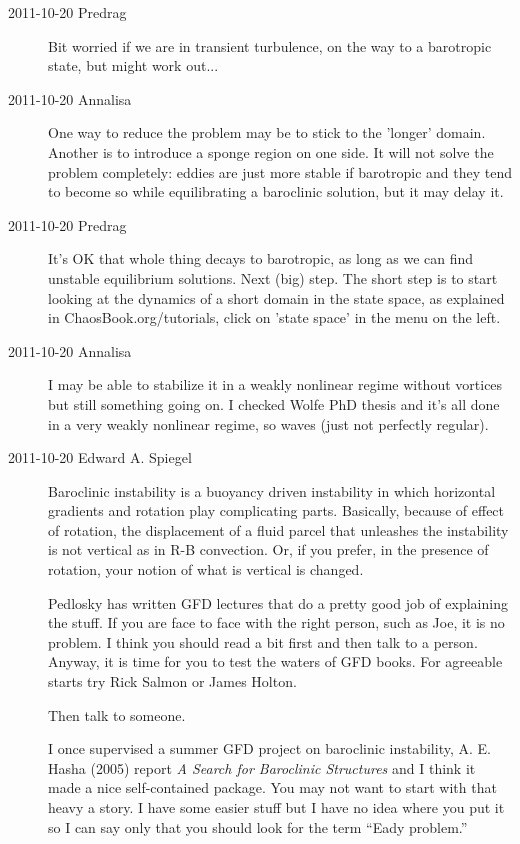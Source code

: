 \begin{description}
\item[2011-10-20 Predrag]
Bit worried if we are in transient turbulence, on the way to a
barotropic state, but might work out...

\item[2011-10-20 Annalisa]
One way to reduce the problem may be to stick to the 'longer' domain.
Another is to introduce a sponge region on one side. It will not solve the problem
completely: eddies are just more stable if barotropic and they tend to
become so while equilibrating a baroclinic solution, but it may delay
it.

\item[2011-10-20 Predrag]
It's OK that whole thing decays to barotropic, as long as we can find
unstable equilibrium solutions. Next (big) step. The short step is
to start looking at the dynamics of a short domain in the state space,
as explained in ChaosBook.org/tutorials, click on 'state space' in the
menu on the left.

\item[2011-10-20 Annalisa]
I may be able to stabilize it in a weakly nonlinear regime without
vortices but still something going on. I checked Wolfe PhD thesis and
it's all done in a very weakly nonlinear regime, so waves (just not
perfectly regular).

\item[2011-10-20 Edward A. Spiegel]
Baroclinic instability is a buoyancy driven instability in which
horizontal gradients and rotation play complicating parts.   Basically,
because of effect of rotation, the displacement of a fluid parcel that
unleashes the instability is not vertical as in R-B convection.  Or, if
you prefer, in the presence of rotation, your notion of what is vertical
is changed.

Pedlosky has written GFD lectures that do a pretty good job of explaining
the stuff.  If you are face to face with the right person, such as Joe,
it is no problem.  I think you should read a bit first and then talk to a
person. Anyway, it is time for you to test the waters of GFD books.  For
agreeable starts try Rick Salmon or James
Holton.

Then talk to someone.

I once supervised a summer GFD project on baroclinic instability,
{A. E. Hasha} (2005) report \emph{A Search for Baroclinic Structures}
and I think it made a nice self-contained package.
You may not want to start with that heavy a story.  I have some
easier stuff but I have no idea where you put it so I can say only
that you should look for the term ``Eady problem.''


\end{description}
